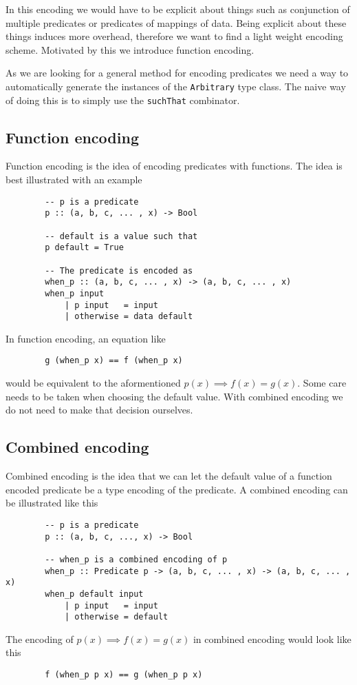         In this encoding we would have to be explicit about things such as conjunction
        of multiple predicates or predicates of mappings of data.
        Being explicit about these things induces more overhead, therefore
        we want to find a light weight encoding scheme. Motivated by this
        we introduce function encoding.

        As we are looking for a general method for encoding predicates we need
        a way to automatically generate the instances of the \texttt{Arbitrary} type class.
        The naive way of doing this is to simply use the \texttt{suchThat} %
        combinator. 

    \subsection{Function encoding}

        Function encoding is the idea of encoding 
        predicates with functions. The idea is best
        illustrated with an example
        \begin{verbatim}
        -- p is a predicate
        p :: (a, b, c, ... , x) -> Bool

        -- default is a value such that
        p default = True

        -- The predicate is encoded as
        when_p :: (a, b, c, ... , x) -> (a, b, c, ... , x)
        when_p input
            | p input   = input
            | otherwise = data default
        \end{verbatim}
        In function encoding, an equation like
        \begin{verbatim}
        g (when_p x) == f (when_p x)
        \end{verbatim}
        would be equivalent to the aformentioned $p(x) \implies f(x) = g(x)$.
        Some care needs to be taken when choosing the default value.
        With combined encoding we do not need to make that decision ourselves.

     \subsection{Combined encoding}\label{combined_encoding}
        
        Combined encoding is the idea that we can let the
        default value of a function encoded predicate be a type
        encoding of the predicate. A combined encoding can be illustrated
        like this
        \begin{verbatim}
        -- p is a predicate
        p :: (a, b, c, ..., x) -> Bool  

        -- when_p is a combined encoding of p
        when_p :: Predicate p -> (a, b, c, ... , x) -> (a, b, c, ... , x)
        when_p default input
            | p input   = input
            | otherwise = default
        \end{verbatim}
        The encoding of $p(x) \implies f(x) = g(x)$ in combined encoding would look like
        this
        \begin{verbatim}
        f (when_p p x) == g (when_p p x)
        \end{verbatim}
